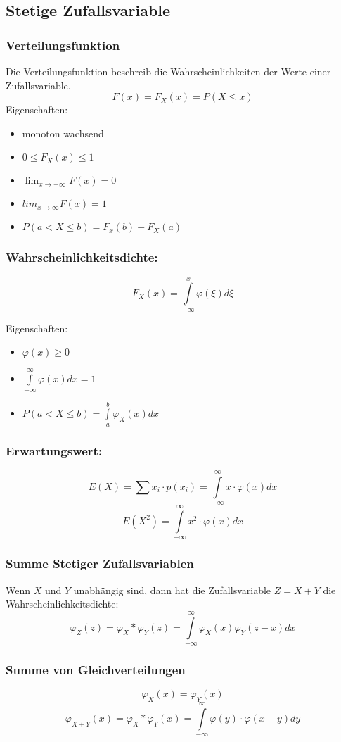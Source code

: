 \documentclass[margin=normal]{tex/hsrzf}
\begin{document}
\subsection{Stetige Zufallsvariable}
\begin{multicols}{2}

    \subsubsection*{Verteilungsfunktion}
    Die Verteilungsfunktion beschreib die Wahrscheinlichkeiten der Werte einer Zufallsvariable.
    $$F(x)= F_X(x) = P(X \leq x)$$
    Eigenschaften:
    \begin{itemize}
        \item monoton wachsend
        \item $0 \leq F_X(x) \leq 1$
        \item $\lim_{x \to -\infty}  F(x) = 0$
        \item $lim_{x \to \infty} F(x) = 1$
        \item $P(a < X \leq b) = F_x(b) - F_X(a)$
    \end{itemize}

    \subsubsection*{Wahrscheinlichkeitsdichte:}
    $$F_X(x) = \int \limits _{-\infty} ^{x} \varphi(\xi)d\xi$$

    Eigenschaften:
    \begin{itemize}
        \item $\varphi(x) \geq 0$
        \item $\int \limits _{-\infty} ^{\infty} \varphi(x)dx = 1$
        \item $P(a < X \leq b) =\int \limits _a ^b \varphi_X(x)dx$
    \end{itemize}

    \subsubsection{Erwartungswert:}
    $$E(X) = \sum x_i \cdot p(x_i) = \int \limits _{-\infty} ^{\infty} x \cdot \varphi(x)dx $$
    $$E(X^2) = \int \limits _{-\infty} ^{\infty} x^2 \cdot \varphi(x) dx$$
    \subsubsection*{Summe Stetiger Zufallsvariablen}
    Wenn $X$ und $Y$ unabhängig sind, dann hat die Zufallsvariable $Z = X + Y$ die Wahrscheinlichkeitsdichte:
    $$\varphi_Z(z) = \varphi_X * \varphi_Y(z) = \int \limits _{-\infty} ^{\infty}  \varphi_X(x) \varphi_Y(z-x)dx$$

    \subsubsection*{Summe von Gleichverteilungen}
    $$\varphi_X(x) = \varphi_Y(x)$$
    $$\varphi_{X+Y}(x) = \varphi_X * \varphi_Y(x) = \int \limits _{-\infty} ^{\infty} \varphi(y)\cdot \varphi(x-y)dy $$
\end{multicols}
\end{document}
